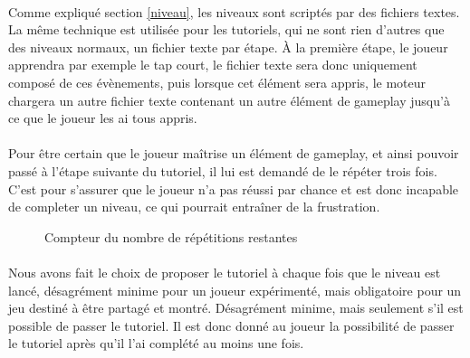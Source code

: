 \paragraph{}
Comme expliqué section \ref{niveau}, les niveaux sont scriptés par des fichiers textes. La même technique est utilisée pour les tutoriels, qui ne sont rien d'autres que des niveaux normaux, un fichier texte par étape. À la première étape, le joueur apprendra par exemple le tap court, le fichier texte sera donc uniquement composé de ces évènements, puis lorsque cet élément sera appris, le moteur chargera un autre fichier texte contenant un autre élément de gameplay jusqu'à ce que le joueur les ai tous appris.

\paragraph{}
Pour être certain que le joueur maîtrise un élément de gameplay, et ainsi pouvoir passé à l'étape suivante du tutoriel, il lui est demandé de le répéter trois fois. C'est pour s'assurer que le joueur n'a pas réussi par chance et est donc incapable de completer un niveau, ce qui pourrait entraîner de la frustration.


\begin{figure}[H]\centering
  \caption{Compteur du nombre de répétitions restantes}
  \label{repetitions}
\end{figure}

\paragraph{}
Nous avons fait le choix de proposer le tutoriel à chaque fois que le niveau est lancé, désagrément minime pour un joueur expérimenté, mais obligatoire pour un jeu destiné à être partagé et montré. Désagrément minime, mais seulement s'il est possible de passer le tutoriel. Il est donc donné au joueur la possibilité de passer le tutoriel après qu'il l'ai complété au moins une fois.

